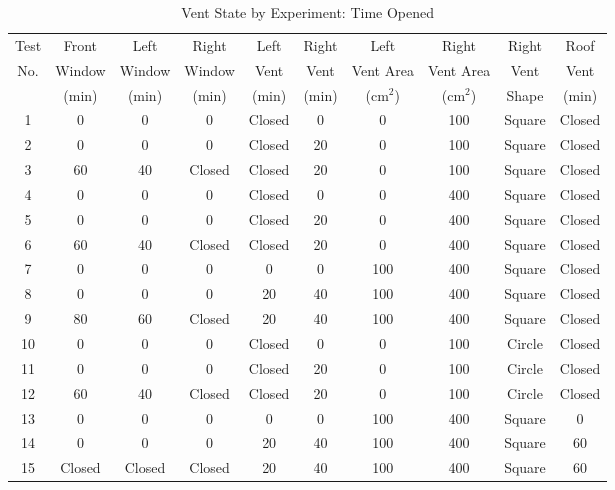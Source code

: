 \begin{table}[h!]
\centering
\caption[Vent State by Experiment: Time Opened]{Vent State by Experiment: Time Opened}
\begin{tabular}{|c|c|c|c|c|c|c|c|c|c|}
\hline
Test & Front    & Left    & Right     & Left     & Right   & Left         & Right        & Right   & Roof    \\
No.  & Window   & Window  & Window    & Vent     & Vent    & Vent Area    & Vent Area    & Vent    & Vent    \\
     & (min)    & (min)   & (min)     & (min)    & (min)   & (cm$^2$)     & (cm$^2$)     & Shape   & (min)   \\ \hline \hline
1    & 0        &  0      &  0        &  Closed  &  0      &  0           &  100         &  Square & Closed  \\ \hline
2    & 0        &  0      &  0        &  Closed  &  20     &  0           &  100         &  Square & Closed  \\ \hline
3    & 60       &  40     &  Closed   &  Closed  &  20     &  0           &  100         &  Square & Closed  \\ \hline
4    & 0        &  0      &  0        &  Closed  &  0      &  0           & 400          &  Square & Closed  \\ \hline
5    & 0        &  0      &  0        &  Closed  &  20     &  0           &  400         &  Square & Closed  \\ \hline
6    & 60       &  40     &  Closed   &  Closed  &  20     &  0           &  400         &  Square & Closed  \\ \hline
7    &  0       &  0      &  0        &  0       &  0      &  100         &  400         &  Square & Closed  \\ \hline
8    &  0       &  0      &  0        &  20      &  40     &  100         &  400         &  Square & Closed  \\ \hline
9    &  80      &  60     &  Closed   &  20      &  40     &  100         &  400         &  Square & Closed  \\ \hline
10   &  0       &  0      &  0        &  Closed  &  0      &  0           &  100         & Circle  & Closed  \\ \hline
11   &  0       &  0      &  0        &  Closed  &  20     &  0           &  100         & Circle  & Closed  \\ \hline
12   &  60      &  40     &  Closed   &  Closed  &  20     &  0           &  100         & Circle  & Closed  \\ \hline
13   &  0       &  0      &  0        &  0       &  0      &  100         &  400         &  Square & 0       \\ \hline
14   &  0       &  0      &  0        &  20      &  40     &  100         &  400         &  Square & 60      \\ \hline
15   &  Closed  & Closed  &  Closed   &  20      &  40     &  100         &  400         &  Square & 60      \\ \hline
\end{tabular}
\label{tab:NIST_Vent_Study}
\end{table}


